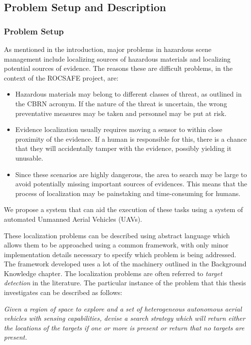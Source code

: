 \subsection{Problem Setup and Description}
\subsubsection{Problem Setup}
As mentioned in the introduction, major problems in hazardous scene management include localizing sources of hazardous materials and localizing potential sources of evidence. The reasons these are difficult problems, in the context of the ROCSAFE project, are:
\begin{itemize}
    \item Hazardous materials may belong to different classes of threat, as outlined in the CBRN acronym. If the nature of the threat is uncertain, the wrong preventative measures may be taken and personnel may be put at risk. 
    \item Evidence localization usually requires moving a sensor to within close proximity of the evidence. If a human is responsible for this, there is a chance that they will accidentally tamper with the evidence, possibly yielding it unusable.
    \item Since these scenarios are highly dangerous, the area to search may be large to avoid potentially missing important sources of evidences. This means that the process of localization may be painstaking and time-consuming for humans.
\end{itemize}
We propose a system that can aid the execution of these tasks using a system of automated Unmanned Aerial Vehicles (UAVs). \par

These localization problems can be described using abstract language which allows them to be approached using a common framework, with only minor implementation details necessary to specify which problem is being addressed. The framework developed uses a lot of the machinery outlined in the Background Knowledge chapter. The localization problems are often referred to \textit{target detection} in the literature. The particular instance of the problem that this thesis investigates can be described as follows: \par

\textit{Given a region of space to explore and a set of heterogeneous autonomous aerial vehicles with sensing capabilities, devise a search strategy which will return either the locations of the targets if one or more is present or return that no targets are present.} \par


